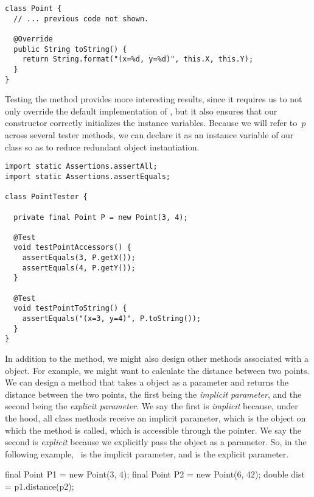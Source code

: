 \begin{lstlisting}[language=MyJava]
class Point {
  // ... previous code not shown.

  @Override
  public String toString() {
    return String.format("(x=%d, y=%d)", this.X, this.Y);
  }
}
\end{lstlisting}

Testing the  method provides more interesting results, since it requires us to not only override the default implementation of , but it also ensures that our constructor correctly initializes the instance variables. 
Because we will refer to~$p$ across several tester methods, we can declare it as an instance variable of our  class so as to reduce redundant object instantiation.

\begin{lstlisting}[language=MyJava]
import static Assertions.assertAll;
import static Assertions.assertEquals;

class PointTester {

  private final Point P = new Point(3, 4);

  @Test
  void testPointAccessors() {
    assertEquals(3, P.getX());
    assertEquals(4, P.getY());
  }

  @Test
  void testPointToString() {
    assertEquals("(x=3, y=4)", P.toString());
  }
}
\end{lstlisting}

In addition to the  method, we might also design other methods associated with a  object. 
For example, we might want to calculate the distance between two points. 
We can design a method that takes a  object as a parameter and returns the distance between the two points, the first being the \emph{implicit parameter}, and the second being the \emph{explicit parameter}. 
We say the first is \emph{implicit} because, under the hood, all class methods receive an implicit parameter, which is the object on which the method is called, which is accessible through the  pointer. 
We say the second is \emph{explicit} because we explicitly pass the object as a parameter. 
So, in the following example,~ is the implicit parameter, and  is the explicit parameter.

\begin{verbnobox}[\small]
final Point P1 = new Point(3, 4);
final Point P2 = new Point(6, 42);
double dist = p1.distance(p2);
\end{verbnobox}


